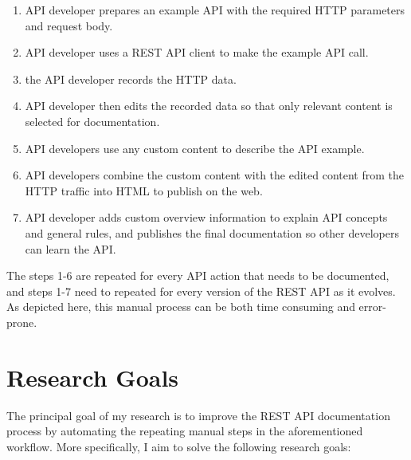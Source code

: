 \begin{enumerate}
  \item API developer prepares an example API with the required HTTP parameters and request body.
  \item API developer uses a REST API client to make the example API call.
  \item the API developer records the HTTP data.
  \item API developer then edits the recorded data so that only relevant content is selected for documentation.
  \item API developers use any custom content to describe the API example.
  \item API developers combine the custom content with the edited content from the HTTP traffic into HTML to publish on the web.
  \item API developer adds custom overview information to explain API concepts and general rules, and publishes the final documentation so other developers can learn the API.
\end{enumerate}

The steps 1-6 are repeated for every API action that needs to be documented, and steps 1-7 need to repeated for every version of the REST API as it evolves. As depicted here, this manual process can be both time consuming and error-prone.

\section{Research Goals}
The principal goal of my research is to improve the REST API documentation process by automating the repeating manual steps in the aforementioned workflow. More specifically, I aim to solve the following research goals:

